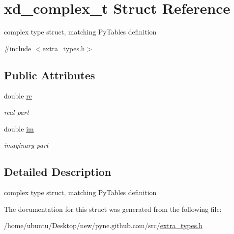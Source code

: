 \hypertarget{structxd__complex__t}{}\section{xd\+\_\+complex\+\_\+t Struct Reference}
\label{structxd__complex__t}


complex type struct, matching Py\+Tables definition  




{\ttfamily \#include $<$extra\+\_\+types.\+h$>$}

\subsection*{Public Attributes}
\begin{DoxyCompactItemize}
\item 
double \hyperlink{structxd__complex__t_afbbb6ed1fe3b729258421cb3eaa8c4d8}{re}\hypertarget{structxd__complex__t_afbbb6ed1fe3b729258421cb3eaa8c4d8}{}\label{structxd__complex__t_afbbb6ed1fe3b729258421cb3eaa8c4d8}

\begin{DoxyCompactList}\small\item\em real part \end{DoxyCompactList}\item 
double \hyperlink{structxd__complex__t_afb1d09ccfa0e10044572c8a7bf4806f2}{im}\hypertarget{structxd__complex__t_afb1d09ccfa0e10044572c8a7bf4806f2}{}\label{structxd__complex__t_afb1d09ccfa0e10044572c8a7bf4806f2}

\begin{DoxyCompactList}\small\item\em imaginary part \end{DoxyCompactList}\end{DoxyCompactItemize}


\subsection{Detailed Description}
complex type struct, matching Py\+Tables definition 

The documentation for this struct was generated from the following file\+:\begin{DoxyCompactItemize}
\item 
/home/ubuntu/\+Desktop/new/pyne.\+github.\+com/src/\hyperlink{extra__types_8h}{extra\+\_\+types.\+h}\end{DoxyCompactItemize}

